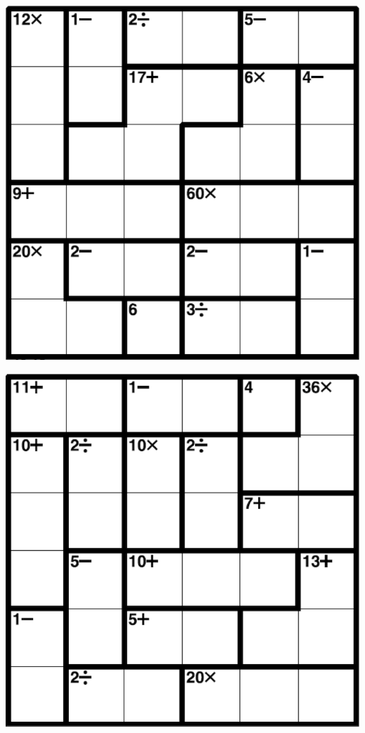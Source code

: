
\includegraphics[scale=1]{Gambar/Lampiran/6x6_19.png}

\includegraphics[scale=1]{Gambar/Lampiran/6x6_20.png}
